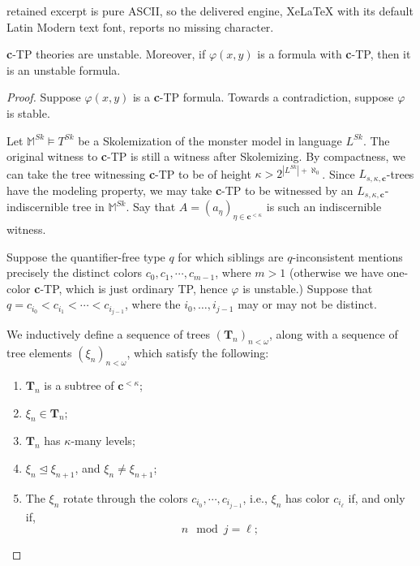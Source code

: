 \documentclass[10pt,a4paper]{amsart}
\newcommand{\bbM}{\mathbb{M}}
\newcommand{\vphi}{\varphi}
\begin{document}
retained excerpt is pure ASCII, so the delivered engine, XeLaTeX with its default Latin Modern text font, reports no missing character.
\begin{theorem}\label{c-TP unstable theorem}
    \textbf{c}-TP theories are unstable. Moreover, if $\vphi(x,y)$ is a formula with \textbf{c}-TP, then it is an unstable formula.
\end{theorem}

\begin{proof}
    Suppose $\vphi(x,y)$ is a \textbf{c}-TP formula. Towards a contradiction, suppose $\vphi$ is stable. 
    
    Let $\bbM^{Sk}\models T^{Sk}$ be a Skolemization of the monster model in language $L^{Sk}$. The original witness to \textbf{c}-TP is still a witness after Skolemizing. By compactness, we can take the tree witnessing \textbf{c}-TP to be of height $\kappa>2^{|L^{Sk}|+\aleph_0}$. Since $L_{s,\kappa, \textbf{c}}$-trees have the modeling property, we may take \textbf{c}-TP to be witnessed by an $L_{s,\kappa, \textbf{c}}$-indiscernible tree in $\bbM^{Sk}$.  Say that $A=(a_{\eta})_{\eta\in \textbf{c}^{<\kappa}}$ is such an indiscernible witness.

    Suppose the quantifier-free type $q$ for which siblings are $q$-inconsistent mentions precisely the distinct colors $c_0, c_1,\dotsm, c_{m-1}$, where $m> 1$ (otherwise we have one-color \textbf{c}-TP, which is just ordinary TP, hence $\vphi$ is unstable.) Suppose that $q=c_{i_0}<c_{i_1}<\dotsm <c_{{i_{j-1}}}$, where the $i_0,\dots, i_{j-1}$ may or may not be distinct.
    
    We inductively define a sequence of trees $(\textbf{T}_n)_{n<\omega}$, along with a  sequence of tree elements $(\xi_n)_{n<\omega}$, which satisfy the following:

    \begin{enumerate}[label=(\alph*)]
        \item $\textbf{T}_n$ is a subtree of $\textbf{c}^{<\kappa}$;

        \item $\xi_n\in \textbf{T}_n$;

        \item $\textbf{T}_n$ has $\kappa$-many levels;
        
        \item $\xi_n\trianglelefteq \xi_{n+1}$, and $\xi_n\neq \xi_{n+1}$;
    
        \item The $\xi_n$ rotate through the colors $c_{i_0},\dotsm, c_{i_{j-1}}$, i.e., $\xi_n$ has color $c_{i_\ell}$ if, and only if, $$n\mod j=\ell;$$


\end{enumerate}
\end{proof}
\end{document}

